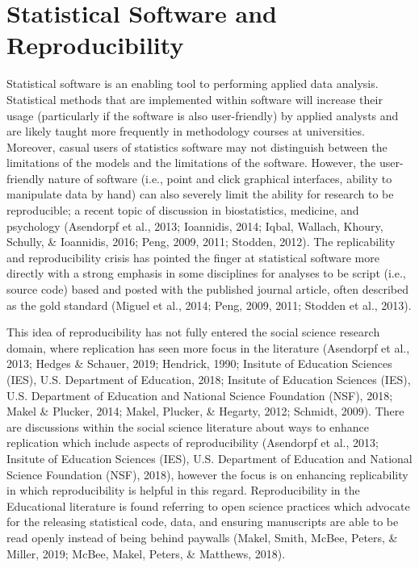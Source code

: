 \documentclass[
  english,
  ,man]{apa6}
\begin{document}
\hypertarget{statistical-software-and-reproducibility}{%
\section{Statistical Software and Reproducibility}\label{statistical-software-and-reproducibility}}

Statistical software is an enabling tool to performing applied data analysis. Statistical methods that are implemented within software will increase their usage (particularly if the software is also user-friendly) by applied analysts and are likely taught more frequently in methodology courses at universities. Moreover, casual users of statistics software may not distinguish between the limitations of the models and the limitations of the software. However, the user-friendly nature of software (i.e., point and click graphical interfaces, ability to manipulate data by hand) can also severely limit the ability for research to be reproducible; a recent topic of discussion in biostatistics, medicine, and psychology (Asendorpf et al., 2013; Ioannidis, 2014; Iqbal, Wallach, Khoury, Schully, \& Ioannidis, 2016; Peng, 2009, 2011; Stodden, 2012). The replicability and reproducibility crisis has pointed the finger at statistical software more directly with a strong emphasis in some disciplines for analyses to be script (i.e., source code) based and posted with the published journal article, often described as the gold standard (Miguel et al., 2014; Peng, 2009, 2011; Stodden et al., 2013).

This idea of reproducibility has not fully entered the social science research domain, where replication has seen more focus in the literature (Asendorpf et al., 2013; Hedges \& Schauer, 2019; Hendrick, 1990; Insitute of Education Sciences (IES), U.S. Department of Education, 2018; Insitute of Education Sciences (IES), U.S. Department of Education and National Science Foundation (NSF), 2018; Makel \& Plucker, 2014; Makel, Plucker, \& Hegarty, 2012; Schmidt, 2009). There are discussions within the social science literature about ways to enhance replication which include aspects of reproducibility (Asendorpf et al., 2013; Insitute of Education Sciences (IES), U.S. Department of Education and National Science Foundation (NSF), 2018), however the focus is on enhancing replicability in which reproducibility is helpful in this regard. Reproducibility in the Educational literature is found referring to open science practices which advocate for the releasing statistical code, data, and ensuring manuscripts are able to be read openly instead of being behind paywalls (Makel, Smith, McBee, Peters, \& Miller, 2019; McBee, Makel, Peters, \& Matthews, 2018).
\end{document}
